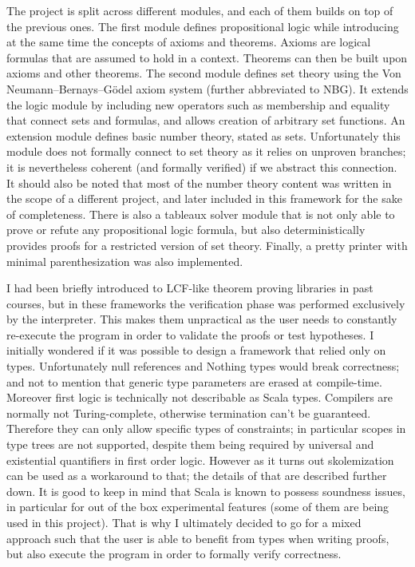 \documentclass[acmlarge]{acmart}
\begin{document}
The project is split across different modules, and each of them builds on top of the previous ones. The first module defines propositional logic while introducing at the same time the concepts of axioms and theorems. Axioms are logical formulas that are assumed to hold in a context. Theorems can then be built upon axioms and other theorems. The second module defines set theory using the Von Neumann–Bernays–Gödel axiom system (further abbreviated to NBG). It extends the logic module by including new operators such as membership and equality that connect sets and formulas, and allows creation of arbitrary set functions. An extension module defines basic number theory, stated as sets. Unfortunately this module does not formally connect to set theory as it relies on unproven branches; it is nevertheless coherent (and formally verified) if we abstract this connection. It should also be noted that most of the number theory content was written in the scope of a different project, and later included in this framework for the sake of completeness. There is also a tableaux solver module that is not only able to prove or refute any propositional logic formula, but also deterministically provides proofs for a restricted version of set theory. Finally, a pretty printer with minimal parenthesization was also implemented.

I had been briefly introduced to LCF-like theorem proving libraries in past courses, but in these frameworks the verification phase was performed exclusively by the interpreter. This makes them unpractical as the user needs to constantly re-execute the program in order to validate the proofs or test hypotheses. I initially wondered if it was possible to design a framework that relied only on types. Unfortunately null references and Nothing types would break correctness; and not to mention that generic type parameters are erased at compile-time. Moreover first logic is technically not describable as Scala types. Compilers are normally not Turing-complete, otherwise termination can't be guaranteed. Therefore they can only allow specific types of constraints; in particular scopes in type trees are not supported, despite them being required by universal and existential quantifiers in first order logic. However as it turns out skolemization can be used as a workaround to that; the details of that are described further down. It is good to keep in mind that Scala is known to possess soundness issues, in particular for out of the box experimental features (some of them are being used in this project). That is why I ultimately decided to go for a mixed approach such that the user is able to benefit from types when writing proofs, but also execute the program in order to formally verify correctness.
\end{document}
